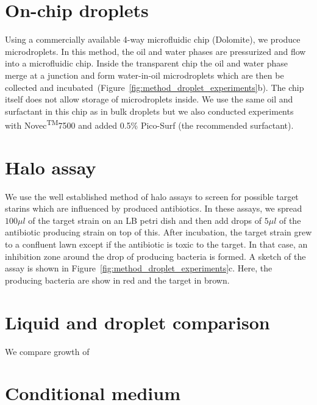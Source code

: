 \section{On-chip droplets}
Using a commercially available 4-way microfluidic chip (Dolomite), we produce microdroplets. In this method, the oil and water phases are pressurized and flow into a microfluidic chip. Inside the transparent chip the oil and water phase merge at a junction and form water-in-oil microdroplets which are then be collected and incubated~(Figure~\ref{fig:method_droplet_experiments}b). The chip itself does not allow storage of microdroplets inside. We use the same oil and surfactant in this chip as in bulk droplets but we also conducted experiments with Novec\textsuperscript{TM}7500 and added 0.5\% Pico-Surf{\textregistered} (the recommended surfactant).

\section{Halo assay}
We use the well established method of halo assays to screen for possible target starins which are influenced by produced antibiotics. In these assays, we spread $100\mu l$ of the target strain on an LB petri dish and then add drops of $5\mu l$ of the antibiotic producing strain on top of this. After incubation, the target strain grew to a confluent lawn except if the antibiotic is toxic to the target. In that case, an inhibition zone around the drop of producing bacteria is formed. A sketch of the assay is shown in Figure~\ref{fig:method_droplet_experiments}c. Here, the producing bacteria are show in red and the target in brown.  

\section{Liquid and droplet comparison}
We compare growth of 

\section{Conditional medium}